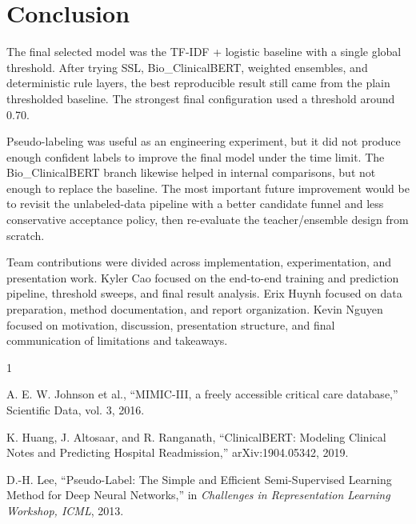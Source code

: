 \documentclass[journal]{IEEEtran}
\begin{document}
\section{Conclusion}

The final selected model was the TF-IDF + logistic baseline with a single global threshold. After trying SSL, Bio\_ClinicalBERT, weighted ensembles, and deterministic rule layers, the best reproducible result still came from the plain thresholded baseline. The strongest final configuration used a threshold around 0.70.

Pseudo-labeling was useful as an engineering experiment, but it did not produce enough confident labels to improve the final model under the time limit. The Bio\_ClinicalBERT branch likewise helped in internal comparisons, but not enough to replace the baseline. The most important future improvement would be to revisit the unlabeled-data pipeline with a better candidate funnel and less conservative acceptance policy, then re-evaluate the teacher/ensemble design from scratch.

Team contributions were divided across implementation, experimentation, and presentation work. Kyler Cao focused on the end-to-end training and prediction pipeline, threshold sweeps, and final result analysis. Erix Huynh focused on data preparation, method documentation, and report organization. Kevin Nguyen focused on motivation, discussion, presentation structure, and final communication of limitations and takeaways.

\begin{thebibliography}{1}

A. E. W. Johnson et al., ``MIMIC-III, a freely accessible critical care database,'' Scientific Data, vol. 3, 2016.

K. Huang, J. Altosaar, and R. Ranganath, ``ClinicalBERT: Modeling Clinical Notes and Predicting Hospital Readmission,'' arXiv:1904.05342, 2019.

D.-H. Lee, ``Pseudo-Label: The Simple and Efficient Semi-Supervised Learning Method for Deep Neural Networks,'' in \textit{Challenges in Representation Learning Workshop, ICML}, 2013.

\end{thebibliography}
\end{document}
